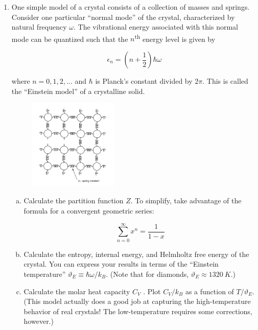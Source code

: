 \begin{enumerate}
    \pagebreak

  \item One simple model of a crystal consists of a collection of
    masses and springs. Consider one particular
    “normal mode” of the crystal, characterized by natural frequency
    $\omega$. The vibrational energy associated
    with this normal mode can be quantized such that the
    $n$\textsuperscript{th} energy level is given by

    \begin{equation*}
      \epsilon_n = \left(n + \frac{1}{2}\right)\hbar \omega
    \end{equation*}

    where $n = 0, 1, 2, \dots$ and $\hbar$ is Planck’s constant
    divided by $2\pi$. This is called the “Einstein model”
    of a crystalline solid.

    \begin{figure}[h]
      \centering
      \includegraphics[width=0.4\textwidth]{./assets/fig_2.png}
    \end{figure}

    \begin{enumerate}[(a)]

      \item Calculate the partition function $Z$. To simplify, take
        advantage of the formula for a convergent
        geometric series:

        \begin{equation*}
          \sum_{n=0}^\infty x^n = \frac{1}{1 - x}
        \end{equation*}

      \item Calculate the entropy, internal energy, and Helmholtz
        free energy of the crystal.
        You can express your results in terms of the “Einstein
        temperature” $\vartheta_E  ≡ \hbar \omega/k_B$.
        (Note that for diamonds, $\vartheta_E \approx \SI{1320}{K}$.)

      \item Calculate the molar heat capacity $C_V$ . Plot $C_V /k_B$
        as a function of $T /\vartheta_E$. (This model actually
          does a good job at capturing the high-temperature behavior
          of real crystals! The low-temperature
        requires some corrections, however.)
    \end{enumerate}

\end{enumerate}



